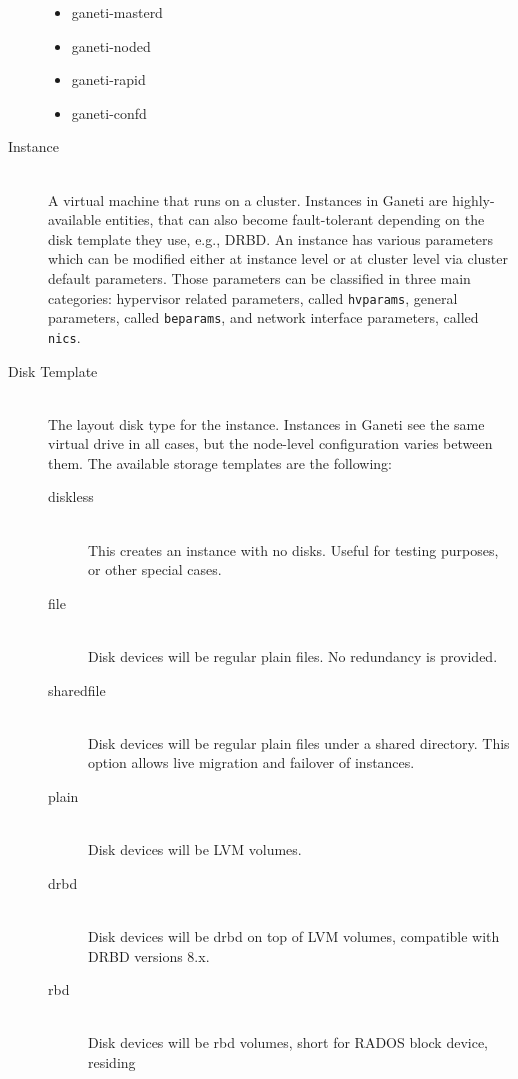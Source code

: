 \begin{description}
    \begin{itemize}
      \item ganeti-masterd
      \item ganeti-noded
      \item ganeti-rapid
      \item ganeti-confd
    \end{itemize}
  \item[Instance] \hfill \\
    A virtual machine that runs on a cluster. Instances in Ganeti are
    highly-available entities, that can also become fault-tolerant depending on
    the disk template they use, e.g., DRBD. An instance has various parameters
    which can be modified either at instance level or at cluster level via
    cluster default parameters. Those parameters can be classified in three
    main categories: hypervisor related parameters, called \texttt{hvparams},
    general parameters, called \texttt{beparams}, and network interface
    parameters, called \texttt{nics}.
  \item[Disk Template] \hfill \\
    The layout disk type for the instance. Instances in Ganeti see the same
    virtual drive in all cases, but the node-level configuration varies between
    them. The available storage templates are the following:
    \begin{description}
      \item[diskless] \hfill \\
        This creates an instance with no disks. Useful for testing purposes, or
        other special cases.
      \item[file] \hfill \\
        Disk devices will be regular plain files. No redundancy is provided.
      \item[sharedfile] \hfill \\
        Disk devices will be regular plain files under a shared directory. This
        option allows live migration and failover of instances.
      \item[plain] \hfill \\
        Disk devices will be LVM volumes.
      \item[drbd] \hfill \\
        Disk devices will be drbd on top of LVM volumes, compatible with DRBD
        versions 8.x.
      \item[rbd] \hfill \\
        Disk devices will be rbd volumes, short for RADOS block device, residing

\end{description}
\end{description}
